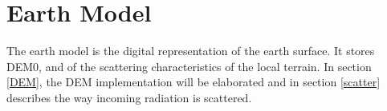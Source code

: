 \section{Earth Model}
\label{earthModel}

The earth model is the digital representation of the earth surface. It stores \ac{DEM0}, and of the
scattering characteristics of the local terrain. In section \ref{DEM}, the \ac{DEM} implementation
will be elaborated and in section \ref{scatter} describes the way incoming radiation is scattered.
